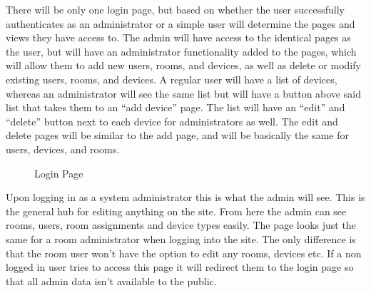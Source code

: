 \documentclass{report}
\begin{document}
\newline
\indent
There will be only one login page, but based on whether the user successfully authenticates as an administrator or a simple user will determine the pages and views they have access to. 
The admin will have access to the identical pages as the user, but will have an administrator functionality added to the pages, which will allow them to add new users, rooms, and devices, as well as delete or modify existing users, rooms, and devices. 
A regular user will have a list of devices, whereas an administrator will see the same list but will have a button above said list that takes them to an “add device” page.  
The list will have an “edit” and “delete” button next to each device for administrators as well. The edit and delete pages will be similar to the add page, and will be basically the same for users, devices, and rooms. 
\begin{figure}[H]
\caption{Login Page}
\end{figure}
\newpage

Upon logging in as a system administrator this is what the admin will see.
This is the general hub for editing anything on the site.
From here the admin can see rooms, users, room assignments and device types easily.
The page looks just the same for a room administrator when logging into the site. 
The only difference is that the room user won't have the option to edit any rooms, devices etc.
If a non logged in user tries to access this page it will redirect them to the login page so that all admin data isn't available to the public.
\end{document}
